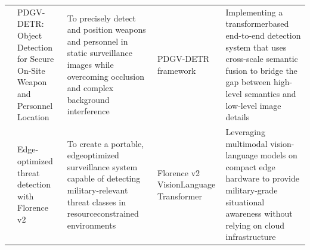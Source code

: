 \begin{longtable}{p{1.21cm} p{3cm} p{3cm} p{3cm} p{3cm}}
    \cite{supplementary_paper_9} &
    PDGV-DETR: Object Detection for Secure On-Site Weapon and Personnel Location &
    To precisely detect and position weapons and personnel in static surveillance images while overcoming occlusion and complex background interference &
    PDGV-DETR framework &
    Implementing a transformerbased end-to-end detection system that uses cross-scale semantic fusion to bridge the gap between high-level semantics and low-level image details \\

    \cite{supplementary_paper_10} &
    Edge-optimized threat detection with Florence v2 &
    To create a portable, edgeoptimized surveillance system capable of detecting military-relevant threat classes in resourceconstrained environments &
    Florence v2 VisionLanguage Transformer &
    Leveraging multimodal vision-language models on compact edge hardware to provide military-grade situational awareness without relying on cloud infrastructure \\
  \end{longtable}
\endgroup
\label{end:comparison}\label{end:literature}

